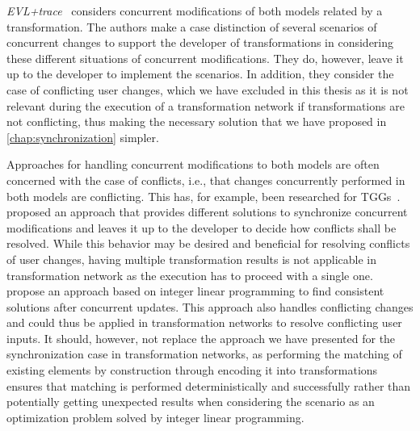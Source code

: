 \emph{EVL+trace}~\cite{samimi-dehkordi2015bidirectionalSynchronization-ICCKE} considers concurrent modifications of both models related by a transformation.
The authors make a case distinction of several scenarios of concurrent changes to support the developer of transformations in considering these different situations of concurrent modifications.
They do, however, leave it up to the developer to implement the scenarios.
In addition, they consider the case of conflicting user changes, which we have excluded in this thesis as it is not relevant during the execution of a transformation network if transformations are not conflicting, thus making the necessary solution that we have proposed in \autoref{chap:synchronization} simpler.

Approaches for handling concurrent modifications to both models are often concerned with the case of conflicts, i.e., that changes concurrently performed in both models are conflicting.
This has, for example, been researched for \glspl{TGG}~\cite{hermann2012concurrentSynchronization-FASE, orejas2020IncrementalConcurrentSynchronization-FASE, weidmann2020ConcurrentSynchronization-SLE}.
\textcite{orejas2020IncrementalConcurrentSynchronization-FASE} proposed an approach that provides different solutions to synchronize concurrent modifications and leaves it up to the developer to decide how conflicts shall be resolved.
While this behavior may be desired and beneficial for resolving conflicts of user changes, having multiple transformation results is not applicable in transformation network as the execution has to proceed with a single one.
\textcite{weidmann2020ConcurrentSynchronization-SLE} propose an approach based on integer linear programming to find consistent solutions after concurrent updates.
This approach also handles conflicting changes and could thus be applied in transformation networks to resolve conflicting user inputs.
It should, however, not replace the approach we have presented for the synchronization case in transformation networks, as performing the matching of existing elements by construction through encoding it into transformations ensures that matching is performed deterministically and successfully rather than potentially getting unexpected results when considering the scenario as an optimization problem solved by integer linear programming.

